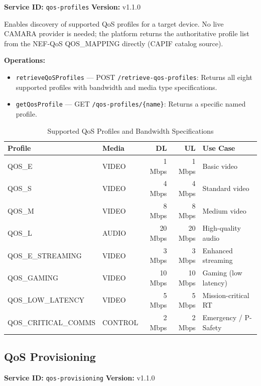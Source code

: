 \documentclass[conference]{IEEEtran}
\begin{document}
\textbf{Service ID:} \texttt{qos-profiles} \quad \textbf{Version:} v1.1.0

Enables discovery of supported QoS profiles for a target device. No live
CAMARA provider is needed; the platform returns the authoritative profile list
from the NEF-QoS QOS\_MAPPING directly (CAPIF catalog source).

\textbf{Operations:}
\begin{itemize}[leftmargin=1.2em]
  \item \texttt{retrieveQoSProfiles} — POST \texttt{/retrieve-qos-profiles}:
        Returns all eight supported profiles with bandwidth and media type
        specifications.
  \item \texttt{getQosProfile} — GET \texttt{/qos-profiles/\{name\}}:
        Returns a specific named profile.
\end{itemize}

\begin{table}[H]
\centering
\caption{Supported QoS Profiles and Bandwidth Specifications}
\label{tab:profiles}
\scriptsize
\begin{tabular}{llrrl}
\toprule
\textbf{Profile} & \textbf{Media} & \textbf{DL} & \textbf{UL} & \textbf{Use Case} \\
\midrule
QOS\_E & VIDEO & 1 Mbps & 1 Mbps & Basic video \\
QOS\_S & VIDEO & 4 Mbps & 4 Mbps & Standard video \\
QOS\_M & VIDEO & 8 Mbps & 8 Mbps & Medium video \\
QOS\_L & AUDIO & 20 Mbps & 20 Mbps & High-quality audio \\
QOS\_E\_STREAMING & VIDEO & 3 Mbps & 3 Mbps & Enhanced streaming \\
QOS\_GAMING & VIDEO & 10 Mbps & 10 Mbps & Gaming (low latency) \\
QOS\_LOW\_LATENCY & VIDEO & 5 Mbps & 5 Mbps & Mission-critical RT \\
QOS\_CRITICAL\_COMMS & CONTROL & 2 Mbps & 2 Mbps & Emergency / P-Safety \\
\bottomrule
\end{tabular}
\end{table}

\subsection{QoS Provisioning}

\textbf{Service ID:} \texttt{qos-provisioning} \quad \textbf{Version:} v1.1.0
\end{document}
